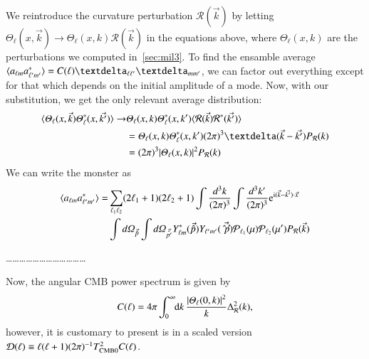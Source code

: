 We reintroduce the curvature perturbation $\mathcal{R}(\vec{k})$ by letting $\Theta_\ell(x,\vec{k}) \to \Theta_\ell(x,k) \mathcal{R}(\vec{k})$ in the equations above, where $\Theta_\ell(x, k)$ are the perturbations we computed in~\cref{sec:mil3}. To find the ensamble average $\langle a\ellm a^*\ellmp \rangle = C(\ell) \deltasym{\ell \ell'} \deltasym{mm'}$, we can factor out everything except for that which depends on the initial amplitude of a mode. Now, with our substitution, we get the only relevant average distribution:
\begin{equation}
\begin{split}
    \langle \Theta_\ell(x,\vec{k}) \Theta_\ell^*(x,\vec{k'})\rangle \to& \Theta_\ell(x,k) \Theta_\ell^*(x,k') \langle \mathcal{R}(\vec{k}) \mathcal{R}^*(\vec{k'}) \rangle \\
    &=  \Theta_\ell(x,k) \Theta_\ell^*(x,k')(2\pi)^3 \deltafunc{\vec{k}-\vec{k'}} P_\mathcal{R}(k) \\
    &= (2\pi)^3 \abs{\Theta_\ell(x,k)}^2 P_\mathcal{R}(k) 
\end{split}
\end{equation}
We can write the monster as
\begin{equation}
\begin{split}
    \langle a\ellm a^*\ellmp \rangle =& \sum_{\ell_1 \ell_2} (2\ell_1 +1) (2\ell_2 +1) \int \frac{d^3k}{(2\pi)^3} \int \frac{d^3k'}{(2\pi)^3}\eu[\im (\vec{k}-\vec{k'})\cdot \vec{x}] \\
    &\int \dOmg[p] \int \dOmg[p'] Y_{\ell m}^*(\vec{\hat{p}}) Y_{\ell' m'}(\vec{\hat{p}'}) \mathcal{P}_{\ell_1}(\mu)\mathcal{P}_{\ell_2}(\mu') P_\mathcal{R}(\vec{k})
\end{split}
\end{equation}


\noindent\dots \dots \dots \dots \dots \dots \dots \dots \dots \dots \dots \dots 

Now, the angular CMB power spectrum is given by
\begin{equation}\label{mil4:theo:eq:C_of_ell_final}
    C(\ell) = 4\pi \int_0^{\infty} \!\!\mathop{}\!\mathrm{d} {k}\, \frac{\abs{\varTheta_\ell(0,k)}^2}{k} \Delta_\mathcal{R}^2(k),
\end{equation}
however, it is customary to present is in a scaled version $\mathcal{D}(\ell) \equiv \ell (\ell +1) (2\pi)^{-1} T_{\mathrm{CMB}0}^2 C(\ell)$.





